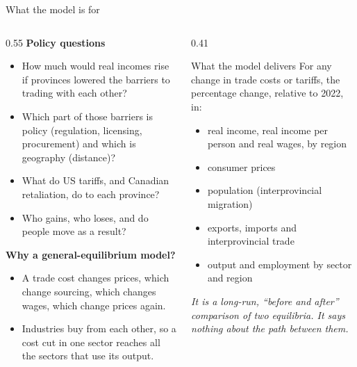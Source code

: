 \documentclass[aspectratio=169,9pt,t]{beamer}
\newcommand{\plain}[1]{{\color{ipgrey}\small\itshape #1}}
\begin{document}
\begin{frame}{What the model is for}
  \begin{columns}[T]
    \begin{column}{0.55\textwidth}
      \textbf{Policy questions}
      \begin{itemize}
        \item How much would real incomes rise if provinces lowered the
              barriers to trading with each other?
        \item Which part of those barriers is policy (regulation, licensing,
              procurement) and which is geography (distance)?
        \item What do US tariffs, and Canadian retaliation, do to each
              province?
        \item Who gains, who loses, and do people move as a result?
      \end{itemize}
      \medskip
      \textbf{Why a general-equilibrium model?}
      \begin{itemize}
        \item A trade cost changes prices, which change sourcing, which
              changes wages, which change prices again.
        \item Industries buy from each other, so a cost cut in one sector
              reaches all the sectors that use its output.
      \end{itemize}
    \end{column}
    \begin{column}{0.41\textwidth}
      \begin{block}{What the model delivers}
        \small
        For any change in trade costs or tariffs, the percentage change,
        relative to 2022, in:
        \begin{itemize}
          \item real income, real income per person and real wages, by region
          \item consumer prices
          \item population (interprovincial migration)
          \item exports, imports and interprovincial trade
          \item output and employment by sector and region
        \end{itemize}
      \end{block}
      \plain{It is a long-run, ``before and after'' comparison of two
      equilibria. It says nothing about the path between them.}
    \end{column}
  \end{columns}
\end{frame}
\end{document}
